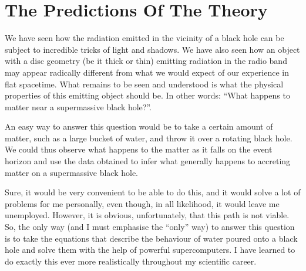 \section{The Predictions Of The Theory}\label{sec:07-theory}

We have seen how the radiation emitted in the vicinity of a black hole can be subject to
incredible tricks of light and shadows. We have also seen how an
object with a disc geometry (be it thick or thin) emitting radiation in the radio band
may appear radically different from what we would expect of our experience in flat
spacetime. What remains to be seen and understood is what the physical properties of
this emitting object should be. In other words: ``What happens to matter near a
supermassive black hole?''.

An easy way to answer this question would be to take a certain amount of matter, such as
a large bucket of water, and throw it over a rotating black hole. We could thus observe
what happens to the matter as it falls on the event horizon and use the data obtained to
infer what generally happens to accreting matter on a supermassive black hole.

Sure, it would be very convenient to be able to do this, and it would solve a lot of
problems for me personally, even though, in all likelihood, it would leave me
unemployed. However, it is obvious, unfortunately, that this path is not viable. So, the
only way (and I must emphasise the ``only'' way) to answer this question is to take the
equations that describe the behaviour of water poured onto a black hole and solve them
with the help of powerful supercomputers. I have learned to do
exactly this ever more realistically throughout my scientific career.

